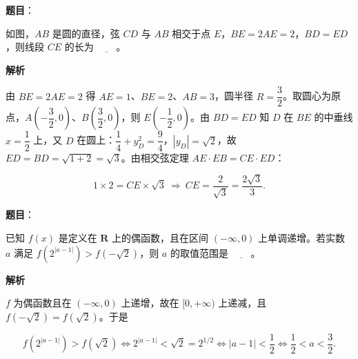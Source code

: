 \begin{answer}

\textbf{题目}：

如图，\(AB\) 是圆的直径，弦 \(CD\) 与 \(AB\) 相交于点 \(E\)，\(BE=2AE=2\)，\(BD=ED\)，则线段 \(CE\) 的长为 \(\underline{\qquad}\)。
\nopagebreak[4]
\begin{center}\end{center}
\nopagebreak[4]
\textbf{解析}

由 \(BE=2AE=2\) 得 \(AE=1\)、\(BE=2\)、\(AB=3\)，圆半径 \(R=\dfrac{3}{2}\)。取圆心为原点，\(A\left(-\dfrac{3}{2},0\right)\)、\(B\left(\dfrac{3}{2},0\right)\)，则 \(E\left(-\dfrac{1}{2},0\right)\)。由 \(BD=ED\) 知 \(D\) 在 \(BE\) 的中垂线 \(x=\dfrac{1}{2}\) 上，又 \(D\) 在圆上：\(\dfrac{1}{4}+y_{D}^{2}=\dfrac{9}{4}\)，\(|y_{D}|=\sqrt{2}\)，故 \(ED=BD=\sqrt{1+2}=\sqrt{3}\)。由相交弦定理 \(AE\cdot EB=CE\cdot ED\)：

\nopagebreak[4]
\[
1\times2=CE\times\sqrt{3}\ \Longrightarrow\ CE=\frac{2}{\sqrt{3}}=\frac{2\sqrt{3}}{3}.
\]


\end{answer}
\begin{answer}

\textbf{题目}：

已知 \(f(x)\) 是定义在 \(\mathbf{R}\) 上的偶函数，且在区间 \((-\infty,0)\) 上单调递增。若实数 \(a\) 满足 \(f\left(2^{|a-1|}\right)>f\left(-\sqrt{2}\right)\)，则 \(a\) 的取值范围是 \(\underline{\qquad}\)。

\textbf{解析}

\(f\) 为偶函数且在 \((-\infty,0)\) 上递增，故在 \([0,+\infty)\) 上递减，且 \(f(-\sqrt{2})=f(\sqrt{2})\)。于是

\nopagebreak[4]
\[
f\left(2^{|a-1|}\right)>f(\sqrt{2})\iff 2^{|a-1|}<\sqrt{2}=2^{1/2}\iff |a-1|<\frac{1}{2}\iff \frac{1}{2}<a<\frac{3}{2}.
\]


\end{answer}
